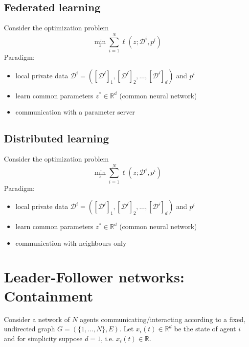 \documentclass{book}
\newcommand{\R}{\mathbb{R}}
\theoremstyle{theoremv2}
\theoremstyle{defv2}
\theoremstyle{remark}
\theoremstyle{remark}
\theoremstyle{definition}
\theoremstyle{definition}
\begin{document}
\section{Federated learning}
Consider the optimization problem 
\[
    \min_z \displaystyle\sum_{i=1}^{N}\ell(z;\mathcal{D}^i,p^i)
\]
Paradigm:
\begin{itemize}
    \item local private data $\mathcal{D}^i = ([\mathcal{D^i}]_1,[\mathcal{D^i}]_2,\dots,[\mathcal{D^i}]_d)$ and $p^i$
    \item learn common parameters $z^*\in\R^d$ (common neural network)
    \item communication with a parameter server
\end{itemize}

\section{Distributed learning}
Consider the optimization problem 
\[
    \min_z \displaystyle\sum_{i=1}^{N}\ell(z;\mathcal{D}^i,p^i)
\]
Paradigm:
\begin{itemize}
    \item local private data $\mathcal{D}^i = ([\mathcal{D^i}]_1,[\mathcal{D^i}]_2,\dots,[\mathcal{D^i}]_d)$ and $p^i$
    \item learn common parameters $z^*\in\R^d$ (common neural network)
    \item communication with neighbours only
\end{itemize}


\chapter{Leader-Follower networks: Containment}
Consider a network of $N$ agents communicating/interacting according to a fixed, undirected graph $G=(\{1,\dots,N\},E)$. Let $x_i(t)\in\R^d$ be the state of agent $i$ and for simplicity suppose $d=1$, i.e. $x_i(t)\in\R$.
\end{document}
